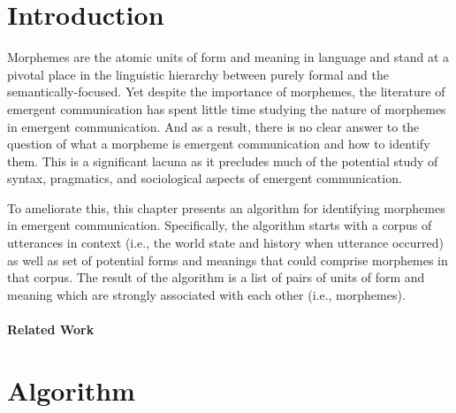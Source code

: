\section{Introduction}

Morphemes are the atomic units of form and meaning in language and stand at a pivotal place in the linguistic hierarchy between purely formal and the semantically-focused.
Yet despite the importance of morphemes, the literature of emergent communication has spent little time studying the nature of morphemes in emergent communication.
And as a result, there is no clear answer to the question of what a morpheme is emergent communication and how to identify them.
This is a significant lacuna as it precludes much of the potential study of syntax, pragmatics, and sociological aspects of emergent communication.

To ameliorate this, this chapter presents an algorithm for identifying morphemes in emergent communication.
Specifically, the algorithm starts with a corpus of utterances in context (i.e., the world state and history when utterance occurred) as well as set of potential forms and meanings that could comprise morphemes in that corpus.
The result of the algorithm is a list of pairs of units of form and meaning which are strongly associated with each other (i.e., morphemes).



\paragraph{Related Work}
\phantom{}%

\section{Algorithm}

